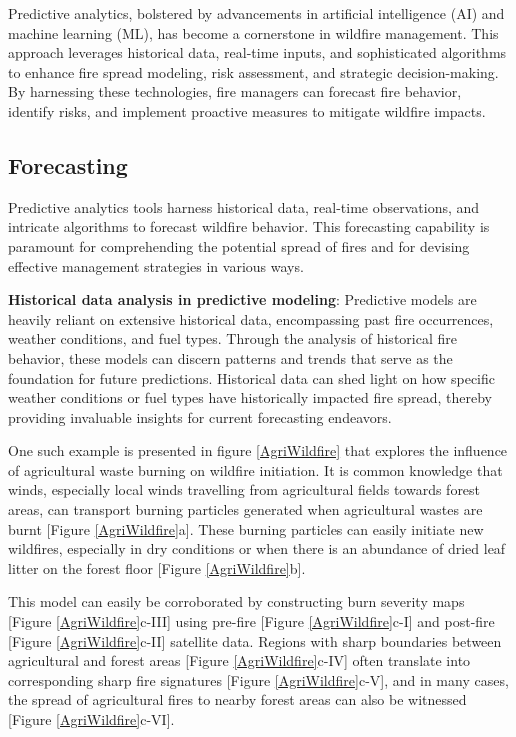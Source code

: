 \documentclass[
  12 pt,
]{Nemilov}
\begin{document}
Predictive analytics, bolstered by advancements in artificial intelligence (AI) and machine learning (ML), has become a cornerstone in wildfire management. This approach leverages historical data, real-time inputs, and sophisticated algorithms to enhance fire spread modeling, risk assessment, and strategic decision-making. By harnessing these technologies, fire managers can forecast fire behavior, identify risks, and implement proactive measures to mitigate wildfire impacts.

\subsection{Forecasting}\label{forecasting}

Predictive analytics tools harness historical data, real-time observations, and intricate algorithms to forecast wildfire behavior. This forecasting capability is paramount for comprehending the potential spread of fires and for devising effective management strategies in various ways.

\textbf{Historical data analysis in predictive modeling}:
Predictive models are heavily reliant on extensive historical data, encompassing past fire occurrences, weather conditions, and fuel types. Through the analysis of historical fire behavior, these models can discern patterns and trends that serve as the foundation for future predictions. Historical data can shed light on how specific weather conditions or fuel types have historically impacted fire spread, thereby providing invaluable insights for current forecasting endeavors.

One such example is presented in figure \ref{AgriWildfire} that explores the influence of agricultural waste burning on wildfire initiation. It is common knowledge that winds, especially local winds travelling from agricultural fields towards forest areas, can transport burning particles generated when agricultural wastes are burnt {[}Figure \ref{AgriWildfire}a{]}. These burning particles can easily initiate new wildfires, especially in dry conditions or when there is an abundance of dried leaf litter on the forest floor {[}Figure \ref{AgriWildfire}b{]}.

This model can easily be corroborated by constructing burn severity maps {[}Figure \ref{AgriWildfire}c-III{]} using pre-fire {[}Figure \ref{AgriWildfire}c-I{]} and post-fire {[}Figure \ref{AgriWildfire}c-II{]} satellite data. Regions with sharp boundaries between agricultural and forest areas {[}Figure \ref{AgriWildfire}c-IV{]} often translate into corresponding sharp fire signatures {[}Figure \ref{AgriWildfire}c-V{]}, and in many cases, the spread of agricultural fires to nearby forest areas can also be witnessed {[}Figure \ref{AgriWildfire}c-VI{]}.
\end{document}
